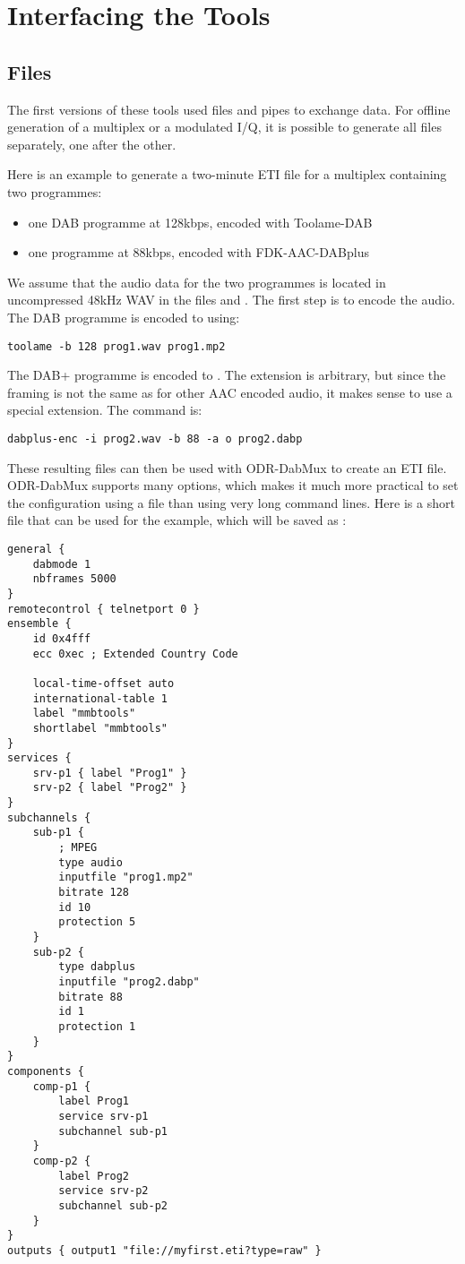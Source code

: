 \section{Interfacing the Tools}
\subsection{Files}
\label{sec-files}
The first versions of these tools used files and pipes to exchange data. For
offline generation of a multiplex or a modulated I/Q, it is possible to
generate all files separately, one after the other.

Here is an example to generate a two-minute ETI file for a multiplex containing
two programmes:
\begin{itemize}
    \item one DAB programme at 128kbps, encoded with Toolame-DAB
    \item one \dabplus{} programme at 88kbps, encoded with FDK-AAC-DABplus
\end{itemize}

We assume that the audio data for the two programmes is located in uncompressed
48kHz WAV in the files  and . The first step
is to encode the audio. The DAB programme is encoded to  using:
\begin{lstlisting}
toolame -b 128 prog1.wav prog1.mp2
\end{lstlisting}

The DAB+ programme is encoded to . The extension
 is arbitrary, but since the framing is not the same as for
other AAC encoded audio, it makes sense to use a special extension. The command
is:
\begin{lstlisting}
dabplus-enc -i prog2.wav -b 88 -a o prog2.dabp
\end{lstlisting}

These resulting files can then be used with ODR-DabMux to create an ETI file.
ODR-DabMux supports many options, which makes it much more practical to set
the configuration using a file than using very long command lines. Here is a short
file that can be used for the example, which will be saved as :
\begin{lstlisting}
general {
    dabmode 1
    nbframes 5000
}
remotecontrol { telnetport 0 }
ensemble {
    id 0x4fff
    ecc 0xec ; Extended Country Code

    local-time-offset auto
    international-table 1
    label "mmbtools"
    shortlabel "mmbtools"
}
services {
    srv-p1 { label "Prog1" }
    srv-p2 { label "Prog2" }
}
subchannels {
    sub-p1 {
        ; MPEG
        type audio
        inputfile "prog1.mp2"
        bitrate 128
        id 10
        protection 5
    }
    sub-p2 {
        type dabplus
        inputfile "prog2.dabp"
        bitrate 88
        id 1
        protection 1
    }
}
components {
    comp-p1 {
        label Prog1
        service srv-p1
        subchannel sub-p1
    }
    comp-p2 {
        label Prog2
        service srv-p2
        subchannel sub-p2
    }
}
outputs { output1 "file://myfirst.eti?type=raw" }
\end{lstlisting}


